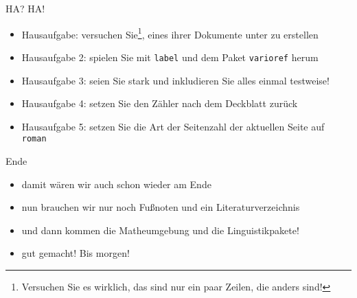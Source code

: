 \begin{frame}[fragile]{HA? HA!}
    \begin{itemize}[<+->]
    \item Hausaufgabe: versuchen Sie\footnote{Versuchen Sie es wirklich, das sind nur ein paar Zeilen, die anders sind!}, eines ihrer Dokumente unter \XeTeX zu erstellen
    \item Hausaufgabe 2: spielen Sie mit \lstinline|label| und dem Paket \lstinline|varioref| herum
    \item Hausaufgabe 3: seien Sie stark und inkludieren Sie alles einmal testweise!
    \item Hausaufgabe 4: setzen Sie den Zähler nach dem Deckblatt zurück
    \item Hausaufgabe 5: setzen Sie die Art der Seitenzahl der aktuellen Seite auf \texttt{roman}
    \end{itemize}
\end{frame}

\begin{frame}[fragile]{Ende}
    \begin{itemize}[<+->]
    \item damit wären wir auch schon wieder am Ende
    \item nun brauchen wir nur noch Fußnoten und ein Literaturverzeichnis
    \item und dann kommen die Matheumgebung und die Linguistikpakete!
    \item gut gemacht! Bis morgen!
    \end{itemize}
\end{frame}
